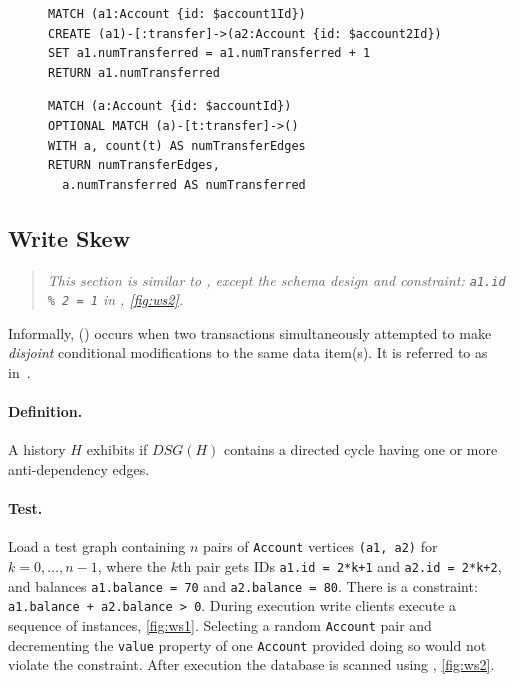 \begin{figure}[htb]
  \centering
  \begin{minipage}{0.41\linewidth}
    \begin{lstlisting}[language=cypher,label=fig:lu1,caption=\tx{Lost Update $T_\mathrm{W}$}.]
MATCH (a1:Account {id: $account1Id})
CREATE (a1)-[:transfer]->(a2:Account {id: $account2Id})
SET a1.numTransferred = a1.numTransferred + 1
RETURN a1.numTransferred
\end{lstlisting}
  \end{minipage}
  \quad
  \begin{minipage}{0.52\linewidth}
    \begin{lstlisting}[language=cypher,label=fig:lu2,caption=\tx{Lost Update $T_\mathrm{R}$}.]
MATCH (a:Account {id: $accountId})
OPTIONAL MATCH (a)-[t:transfer]->()
WITH a, count(t) AS numTransferEdges
RETURN numTransferEdges,
  a.numTransferred AS numTransferred
\end{lstlisting}
  \end{minipage}
\end{figure}

\subsection{Write Skew}
\label{sec:write-skew}

\begin{quote}
  \textit{This section is similar to \ldbcsnb, except the schema design and
    constraint: \texttt{a1.id \% 2 = 1} in , \autoref{fig:ws2}.
  }
\end{quote}

Informally,  () occurs when two transactions
simultaneously attempted to make \emph{disjoint} conditional modifications to
the same data item(s). It is referred to as 
in~\cite{adya1999weak,DBLP:journals/tods/FeketeLOOS05}.

\paragraph{Definition.}
A history $H$ exhibits  if $\textit{DSG}(H)$ contains a directed
cycle having one or more anti-dependency edges.

\paragraph{Test.}
Load a test graph containing $n$ pairs of \texttt{Account} vertices
\texttt{(a1, a2)} for $k = 0, \ldots, n-1$, where the $k$th pair gets IDs
\texttt{a1.id = 2*k+1} and \texttt{a2.id = 2*k+2}, and balances
\texttt{a1.balance = 70} and \texttt{a2.balance = 80}. There is a constraint:
\texttt{a1.balance + a2.balance > 0}. During execution write clients execute a
sequence of  instances, \autoref{fig:ws1}. Selecting a
random \texttt{Account} pair and decrementing the \texttt{value} property of
one \texttt{Account} provided doing so would not violate the constraint. After
execution the database is scanned using , \autoref{fig:ws2}.

